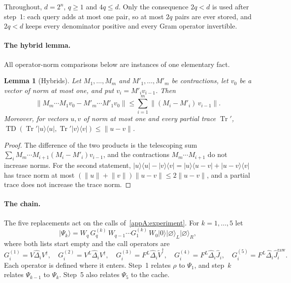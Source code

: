 \documentclass[11pt,letterpaper]{article}
\newtheorem{lemma}[theorem]{Lemma}
\theoremstyle{definition}\newtheorem{definition}[theorem]{Definition}
\newcommand{\Tr}{\operatorname{Tr}}
\newcommand{\TD}{\operatorname{TD}}
\newcommand{\ket}[1]{\lvert#1\rangle}
\newcommand{\bra}[1]{\langle#1\rvert}
\newcommand{\proj}[1]{\ket{#1}\!\bra{#1}}
\newcommand{\norm}[1]{\lVert#1\rVert}
\begin{document}
Throughout, $d=2^n$, $q\ge1$ and $4q\le d$. Only the consequence $2q<d$
is used after step~1: each query adds at most one pair, so at most $2q$
pairs are ever stored, and $2q<d$ keeps every denominator positive and
every Gram operator invertible.

\paragraph{The hybrid lemma.}
All operator-norm comparisons below are instances of one elementary
fact.

\begin{lemma}[Hybrids]\label{appA:hybrid}
Let $M_1,\dots,M_m$ and $M'_1,\dots,M'_m$ be contractions, let $v_0$ be
a vector of norm at most one, and put $v_i=M'_iv_{i-1}$. Then
\[
 \norm{M_m\cdots M_1v_0-M'_m\cdots M'_1v_0}\le
 \sum_{i=1}^m\norm{(M_i-M'_i)\,v_{i-1}} .
\]
Moreover, for vectors $u,v$ of norm at most one and every partial
trace $\Tr'$, $\TD(\Tr'\proj u,\Tr'\proj v)\le\norm{u-v}$.
\end{lemma}

\begin{proof}
The difference of the two products is the telescoping sum
$\sum_iM_m\cdots M_{i+1}(M_i-M'_i)v_{i-1}$, and the contractions
$M_m\cdots M_{i+1}$ do not increase norms. For the second statement,
$\proj u-\proj v=\ket u\bra{u-v}+\ket{u-v}\bra v$ has trace norm at
most $(\norm u+\norm v)\norm{u-v}\le2\norm{u-v}$, and a partial trace
does not increase the trace norm.
\end{proof}

\paragraph{The chain.}
The five replacements act on the calls of~\eqref{appA:experiment}. For
$k=1,\dots,5$ let
\begin{equation}\label{appA:chain}
 \ket{\Psi_k}=W_q\,G^{(k)}_q\,W_{q-1}\cdots G^{(k)}_1\,W_0
   \ket0\ket{\varnothing}_L\ket{\varnothing}_R ,
\end{equation}
where both lists start empty and the call operators are
\[
 G^{(1)}_i=V\widehat\Delta_iV^\dagger,\quad
 G^{(2)}_i=V^L\widehat\Delta_iV^\dagger,\quad
 G^{(3)}_i=F^L\widehat\Delta_i\widetilde V^\dagger,\quad
 G^{(4)}_i=F^L\widehat\Delta_i\widehat J_i,\quad
 G^{(5)}_i=F^L\widehat\Delta_i\widehat J^{\mathrm{raw}}_i .
\]
Each operator is defined where it enters. Step~1 relates $\rho$ to
$\Psi_1$, and step~$k$ relates $\Psi_{k-1}$ to $\Psi_k$. Step~5 also
relates $\Psi_5$ to the cache.
\end{document}
